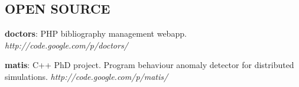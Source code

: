 \documentclass[margin]{res}
\begin{document}
\begin{resume}
\section{OPEN SOURCE}
\begin{list}{}{\leftmargin=1em}
\item {\bf doctors}: PHP bibliography management webapp.  {\em http://code.google.com/p/doctors/}
\item {\bf matis}: C++ PhD project.  Program behaviour anomaly detector for distributed simulations.  {\em http://code.google.com/p/matis/}
\end{list}




 




\end{resume} 
\end{document}
